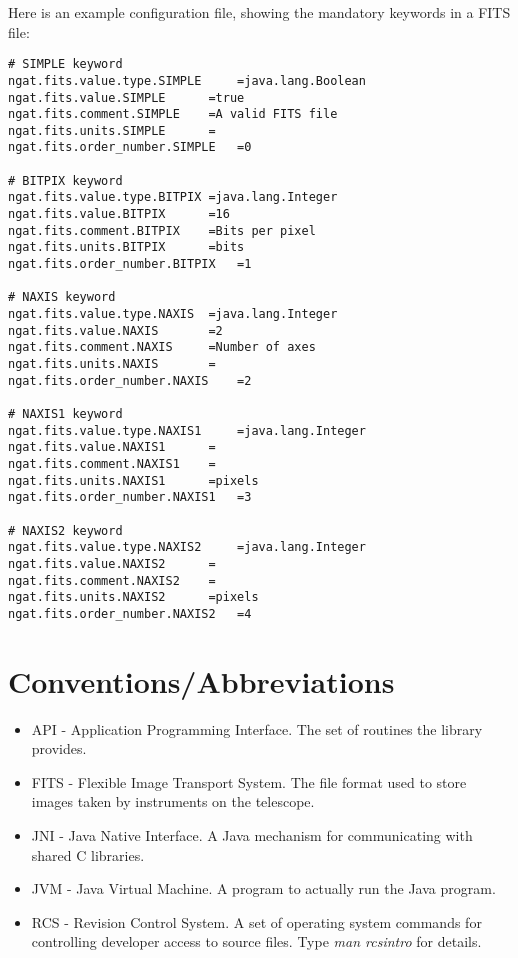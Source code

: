 \documentclass[10pt,a4paper]{article}
\begin{document}
Here is an example configuration file, showing the mandatory keywords in a FITS file:

\begin{verbatim}
# SIMPLE keyword
ngat.fits.value.type.SIMPLE 	=java.lang.Boolean
ngat.fits.value.SIMPLE 		=true
ngat.fits.comment.SIMPLE	=A valid FITS file
ngat.fits.units.SIMPLE		=
ngat.fits.order_number.SIMPLE	=0

# BITPIX keyword
ngat.fits.value.type.BITPIX	=java.lang.Integer
ngat.fits.value.BITPIX 		=16
ngat.fits.comment.BITPIX	=Bits per pixel
ngat.fits.units.BITPIX		=bits
ngat.fits.order_number.BITPIX	=1

# NAXIS keyword
ngat.fits.value.type.NAXIS	=java.lang.Integer
ngat.fits.value.NAXIS 		=2
ngat.fits.comment.NAXIS		=Number of axes
ngat.fits.units.NAXIS		=
ngat.fits.order_number.NAXIS	=2

# NAXIS1 keyword
ngat.fits.value.type.NAXIS1 	=java.lang.Integer
ngat.fits.value.NAXIS1 		=
ngat.fits.comment.NAXIS1	=
ngat.fits.units.NAXIS1		=pixels
ngat.fits.order_number.NAXIS1	=3

# NAXIS2 keyword
ngat.fits.value.type.NAXIS2 	=java.lang.Integer
ngat.fits.value.NAXIS2		=
ngat.fits.comment.NAXIS2	=
ngat.fits.units.NAXIS2		=pixels
ngat.fits.order_number.NAXIS2	=4
\end{verbatim}

\section{Conventions/Abbreviations}
\begin{itemize}
\item API - Application Programming Interface. The set of routines the library provides.
\item FITS - Flexible Image Transport System. The file format used to store images taken by instruments
	on the telescope.
\item JNI - Java Native Interface. A Java mechanism for communicating with shared C libraries.
\item JVM - Java Virtual Machine. A program to actually run the Java program.
\item RCS - Revision Control System. A set of operating system commands for controlling developer access to
source files. Type {\em man rcsintro} for details.
\end{itemize}
\end{document}
